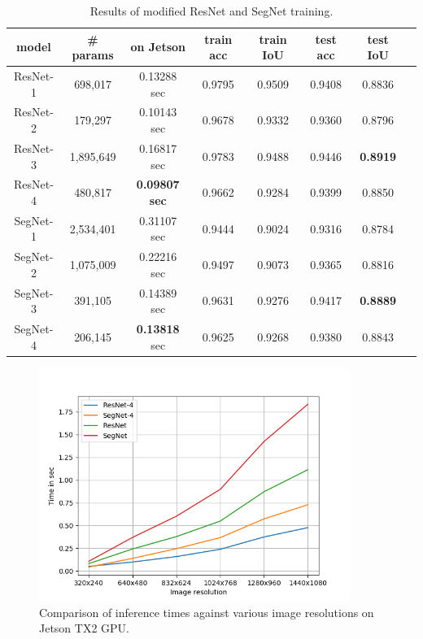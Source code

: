 \begin{table}[h]
	\centering
	\begin{tabular}{|c||c|c|c|c|c|c|c}
	    \hline
		model & \# params & on Jetson & train acc & train IoU & test acc & test IoU\\
		\hline
		ResNet-1 & 698,017 & 0.13288 sec & 0.9795 & 0.9509 & 0.9408 & 0.8836 \\
		\hline
		ResNet-2 & 179,297 & 0.10143 sec & 0.9678 & 0.9332 & 0.9360 & 0.8796 \\
		\hline
		ResNet-3 & 1,895,649 & 0.16817 sec & 0.9783 & 0.9488 & 0.9446 & \textbf{0.8919} \\
		\hline
		ResNet-4 & 480,817 & \textbf{0.09807 sec} & 0.9662 & 0.9284 & 0.9399 & 0.8850 \\
		\hline
		\hline
		SegNet-1 & 2,534,401 & 0.31107 sec & 0.9444 & 0.9024 & 0.9316 & 0.8784 \\
		\hline
		SegNet-2 & 1,075,009 & 0.22216 sec & 0.9497 & 0.9073 & 0.9365 & 0.8816 \\
		\hline
		SegNet-3 & 391,105 & 0.14389 sec & 0.9631 & 0.9276 & 0.9417 & \textbf{0.8889} \\
		\hline
		SegNet-4 & 206,145 & \textbf{0.13818} sec & 0.9625 & 0.9268 & 0.9380 & 0.8843\\
		\hline
	\end{tabular}
	\caption[Results of modified ResNet and SegNet training]{Results of modified ResNet and SegNet training.}
	\label{tab:reduced_resnet_segnet}
\end{table}

\begin{figure}[!h]
	\centerline{\includegraphics[width=0.9\textwidth]{images/inference_times.png}}
	\caption[Comparison of inference times against various image resolutions]{Comparison of inference times against various image resolutions on Jetson TX2 GPU.}
	\label{img:inference_times_comparison}
\end{figure}

